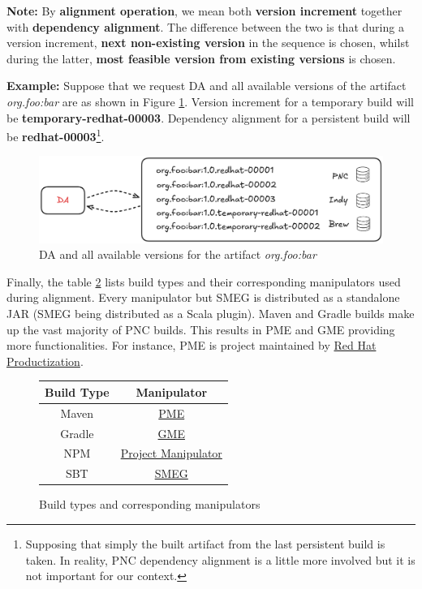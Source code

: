 \documentclass[../main.tex]{subfiles}
\begin{document}
\textbf{Note:} By \textbf{alignment operation}, we mean both \textbf{version increment} together with \textbf{dependency alignment}. The difference between the two is that during a version increment, \textbf{next non-existing version} in the sequence is chosen, whilst during the latter, \textbf{most feasible version from existing versions} is chosen.

\textbf{Example:} Suppose that we request DA and all available versions of the artifact \textit{org.foo:bar} are as shown in Figure \ref{fig:version-increment-vs-dependency-alignment}. Version increment for a temporary build will be \textbf{temporary-redhat-00003}. Dependency alignment for a persistent build will be \textbf{redhat-00003}\footnote{Supposing that simply the built artifact from the last persistent build is taken. In reality, PNC dependency alignment is a little more involved but it is not important for our context.}.

\begin{figure}
  \begin{center}
    \includegraphics[width=\textwidth]{images/version-increment-vs-dependency-alignment.png}
  \end{center}
  \caption{DA and all available versions for the artifact \textit{org.foo:bar}}
  \label{fig:version-increment-vs-dependency-alignment}
\end{figure}

Finally, the table \ref{table:build-types-and-manipulators} lists build types and their corresponding manipulators used during alignment. Every manipulator but SMEG is distributed as a standalone JAR (SMEG being distributed as a Scala plugin). Maven and Gradle builds make up the vast majority of PNC builds. This results in PME and GME providing more functionalities. For instance, PME is project maintained by \href{https://github.com/release-engineering}{Red Hat Productization}.

\begin{figure}
    \begin{center}
    \begin{tabular}{ |c|c| }
    \hline
    Build Type & Manipulator \\
    \hline
    Maven & \href{https://github.com/release-engineering/pom-manipulation-ext}{PME} \\ 
    Gradle & \href{https://github.com/project-ncl/gradle-manipulator}{GME} \\ 
    NPM & \href{https://github.com/project-ncl/project-manipulator}{Project Manipulator} \\ 
    SBT & \href{https://github.com/project-ncl/smeg}{SMEG} \\
    \hline
    \end{tabular}
    \end{center}
    \caption{Build types and corresponding manipulators}
    \label{table:build-types-and-manipulators}
\end{figure}
\end{document}
